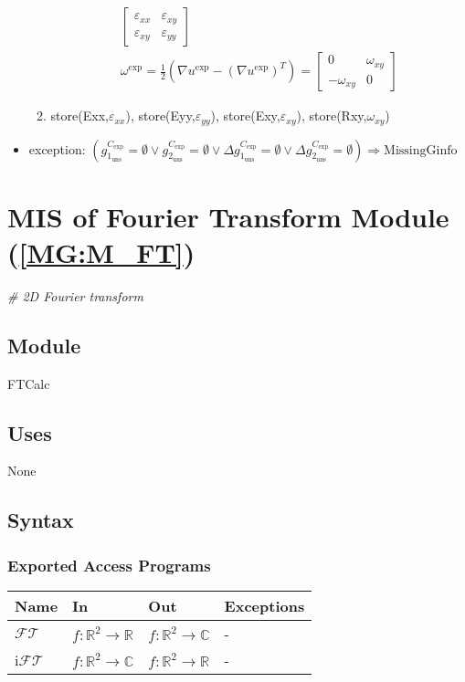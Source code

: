 \documentclass[12pt, titlepage]{article}
\begin{document}
\begin{itemize}
\begin{enumerate}
\begin{equation*}
\begin{gathered}
\begin{bmatrix}
	\varepsilon_{\mathit{xx}} & \varepsilon_{\mathit{xy}} \\
	\varepsilon_{\mathit{xy}} & \varepsilon_{\mathit{yy}}
	\end{bmatrix} \\
\omega^{\text{exp}} = \frac{1}{2}(\nabla u^{\text{exp}}-(\nabla 
u^{\text{exp}})^{T})= \begin{bmatrix}
	0 & \omega_{\mathit{xy}} \\
	-\omega_{\mathit{xy}} & 0
	\end{bmatrix}
\end{gathered}
\end{equation*}
\item store(Exx,$\varepsilon_{\mathit{xx}}$), 
store(Eyy,$\varepsilon_{\mathit{yy}}$), store(Exy,$\varepsilon_{\mathit{xy}}$), 
store(Rxy,$\omega_{\mathit{xy}}$) 
\end{enumerate}  
\item exception:\newline
$(g_{1_{{\text{uns}}}}^{C_{\text{exp}}}=\emptyset \vee 
g_{2_{{\text{uns}}}}^{C_{\text{exp}}}=\emptyset \vee \Delta 
g_{1_{{\text{uns}}}}^{C_{\text{exp}}}=\emptyset \vee \Delta 
g_{2_{{\text{uns}}}}^{C_{\text{exp}}}=\emptyset) \Rightarrow 
\text{MissingGinfo}$
\end{itemize}

\section{MIS of Fourier Transform Module (\texorpdfstring{\cref{MG:M_FT}}))} 
\label{MIS_FT}
\textit{{\#} 2D Fourier transform}
\subsection{Module}
FTCalc
\subsection{Uses}
None
\subsection{Syntax}

\subsubsection{Exported Access Programs}

\begin{center}
\begin{tabular}{p{2cm} p{4cm} p{4cm} p{2cm}}
\hline
\textbf{Name} & \textbf{In} & \textbf{Out} & \textbf{Exceptions} \\
\hline
$\mathcal{FT}$ & $f:\mathbb{R}^2\rightarrow\mathbb{R}$ & 
$f:\mathbb{R}^2\rightarrow\mathbb{C}$ & - \\
i$\mathcal{FT}$ & $f:\mathbb{R}^2\rightarrow\mathbb{C}$ & 
$f:\mathbb{R}^2\rightarrow\mathbb{R}$ & - \\
\hline
\end{tabular}
\end{center}
\end{document}
